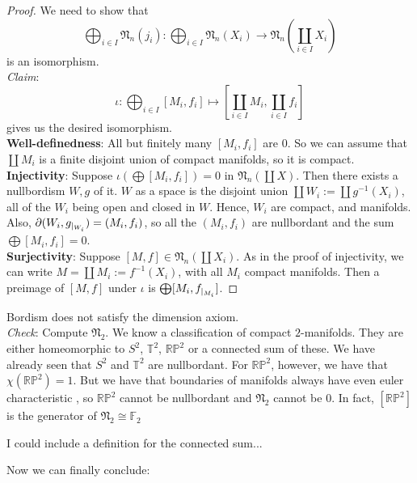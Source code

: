 \documentclass[a4paper,11pt]{article}
\begin{document}
\begin{proof}\cite{zhang}
    We need to show that 
    \[\bigoplus_{i\in I}\mathfrak{N}_n(j_i):\bigoplus_{i\in I}\mathfrak{N}_n(X_i)\to\mathfrak{N}_n\left(\coprod_{i\in I}X_i\right)\] 
    is an isomorphism.\\
    \textit{Claim}: \[\iota:\bigoplus_{i\in I}[M_i,f_i]\mapsto \left[\coprod_{i\in I}M_i,\coprod_{i\in I} f_i\right]\]
    gives us the desired isomorphism.\\
    \textbf{Well-definedness}: All but finitely many \([M_i,f_i]\) are \(0\). So we can assume that \(\coprod M_i\) is a finite disjoint union of compact manifolds, so it is compact.\\
    \textbf{Injectivity}: Suppose \(\iota\left(\bigoplus[M_i,f_i]\right)=0\) in \(\mathfrak{N}_n(\coprod X)\). Then there exists a nullbordism \(W,g\) of it. \(W\) as a space is the disjoint union \(\coprod W_i:=\coprod g^{-1}(X_i)\), all of the \(W_i\) being open and closed in \(W\). Hence, \(W_i\) are compact, and manifolds. Also, \(\partial(W_i,g_{|_{W_i}})=(M_i,f_i)\), so all the \((M_i,f_i)\) are nullbordant and the sum \(\bigoplus[M_i,f_i]=0\).
    \\
    \textbf{Surjectivity}: Suppose \([M,f]\in\mathfrak{N}_n(\coprod X_i)\). As in the proof of injectivity, we can write \(M=\coprod M_i:=f^{-1}(X_i)\), with all \(M_i\) compact manifolds. Then a preimage of \([M,f]\) under \(\iota\) is \(\bigoplus[M_i,f_{|_{M_i}}]\).
\end{proof}

\begin{observation}
    Bordism does not satisfy the dimension axiom.\\
    \textit{Check}: Compute \(\mathfrak{N}_2\). We know a classification of compact \(2\)-manifolds. They are either homeomorphic to \(S^2\), \(\mathbb{T}^2\), \(\mathbb{RP}^2\) or a connected sum of these. We have already seen that \(S^2\) and \(\mathbb{T}^2\) are nullbordant. For \(\mathbb{RP}^2\), however, we have that \(\chi(\mathbb{RP}^2)=1\). But we have that boundaries of manifolds always have even euler characteristic {\cite[Proposition 18.6.2]{dieck}}, so \(\mathbb{RP}^2\) cannot be nullbordant and \(\mathfrak{N}_2\) cannot be \(0\). In fact, \([\mathbb{RP}^2]\) is the generator of \(\mathfrak{N}_2\cong\mathbb{F}_2\)
\end{observation}

I could include a definition for the connected sum...

Now we can finally conclude:
\end{document}

